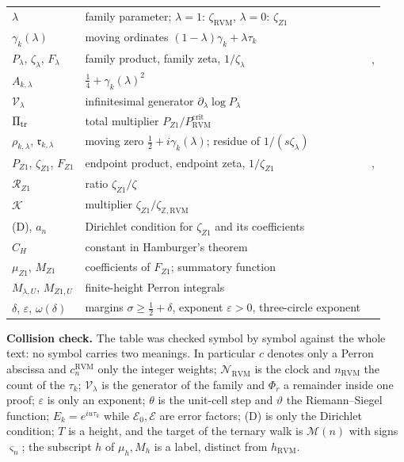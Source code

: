 \documentclass[11pt,reqno]{amsart}
\makeatletter
\let\CG@origeqref\eqref
\newcommand{\CG@gettip}[1]{\@ifundefined{CGTip@#1}{Reference: #1}{\csname CGTip@#1\endcsname}}
\DeclareRobustCommand{\CGeqref}[1]{\pdftooltip{\CG@origeqref{#1}}{\CG@gettip{#1}}}
\numberwithin{equation}{section}
\theoremstyle{plain}
\theoremstyle{definition}
\theoremstyle{remark}
\newcommand{\Z}{\mathbb Z}
\newcommand{\eps}{\varepsilon}
\newcommand{\RVM}{\mathrm{RVM}}
\newcommand{\crit}{\mathrm{crit}}
\newcommand{\NR}{\mathcal N_{\RVM}}
\makeatother
\begin{document}
{\begin{longtable}{>{\raggedright\arraybackslash}p{}>{\raggedright\arraybackslash}p{}>{\raggedright\arraybackslash}p{}}
$\lambda$ & family parameter; $\lambda=1$: $\zeta_{\RVM}$, $\lambda=0$: $\zeta_{Z1}$ & \CGeqref{eq:gamma-lambda}\\
$\gamma_k(\lambda)$ & moving ordinates $(1-\lambda)\gamma_k+\lambda\tau_k$ & \CGeqref{eq:gamma-lambda}\\
$P_\lambda$, $\zeta_\lambda$, $F_\lambda$ & family product, family zeta, $1/\zeta_\lambda$ & \CGeqref{eq:P-lambda}, \CGeqref{eq:zeta-lambda}\\
$A_{k,\lambda}$ & $\tfrac14+\gamma_k(\lambda)^2$ & \CGeqref{eq:generator}\\
$\mathcal V_\lambda$ & infinitesimal generator $\partial_\lambda\log P_\lambda$ & \CGeqref{eq:generator}\\
$\Pi_{\rm tr}$ & total multiplier $P_{Z1}/P_{\RVM}^{\crit}$ & \CGeqref{eq:transport-multiplier}\\
$\rho_{k,\lambda}$, $\mathfrak r_{k,\lambda}$ & moving zero $\tfrac12+i\gamma_k(\lambda)$; residue of $1/(s\zeta_\lambda)$ & \CGeqref{eq:residue-transport}\\
$P_{Z1}$, $\zeta_{Z1}$, $F_{Z1}$ & endpoint product, endpoint zeta, $1/\zeta_{Z1}$ & \CGeqref{eq:Z1-product}, \CGeqref{eq:FZ1}\\
$\mathscr R_{Z1}$ & ratio $\zeta_{Z1}/\zeta$ & \CGeqref{eq:Z1-defect-ratio}\\
$\mathcal K$ & multiplier $\zeta_{Z1}/\zeta_{\Z,\RVM}$ & \CGeqref{eq:K-multiplier}\\
(D), $a_n$ & Dirichlet condition for $\zeta_{Z1}$ and its coefficients & \CGeqref{eq:Z1-D}\\
$C_H$ & constant in Hamburger's theorem & \CGeqref{eq:Hamburger-conclusion}\\
$\mu_{Z1}$, $M_{Z1}$ & coefficients of $F_{Z1}$; summatory function & \CGeqref{eq:Z1-reciprocal-Dirichlet}\\
$M_{\lambda,U}$, $M_{Z1,U}$ & finite-height Perron integrals & \CGeqref{eq:truncated-Perron}\\
$\delta$, $\eps$, $\omega(\delta)$ & margins $\sigma\ge\tfrac12+\delta$, exponent $\eps>0$, three-circle exponent & \CGeqref{eq:three-circles-exponent}\\
\end{longtable}
}

\medskip\noindent\textbf{Collision check.}
The table was checked symbol by symbol against the whole text: no symbol carries two meanings.  In particular $c$ denotes only a Perron abscissa and $c_n^{\RVM}$ only the integer weights; $\NR$ is the clock and $n_{\RVM}$ the count of the $\tau_k$; $\mathcal V_\lambda$ is the generator of the family and $\Phi_r$ a remainder inside one proof; $\eps$ is only an exponent; $\theta$ is the unit-cell step and $\vartheta$ the Riemann--Siegel function; $E_k=e^{iu\tau_k}$ while $\mathcal E_0,\mathcal E$ are error factors; (D) is only the Dirichlet condition; $T$ is a height, and the target of the ternary walk is $\mathcal M(n)$ with signs $\varsigma_n$; the subscript $h$ of $\mu_h,M_h$ is a label, distinct from $h_{\RVM}$.
\end{document}
